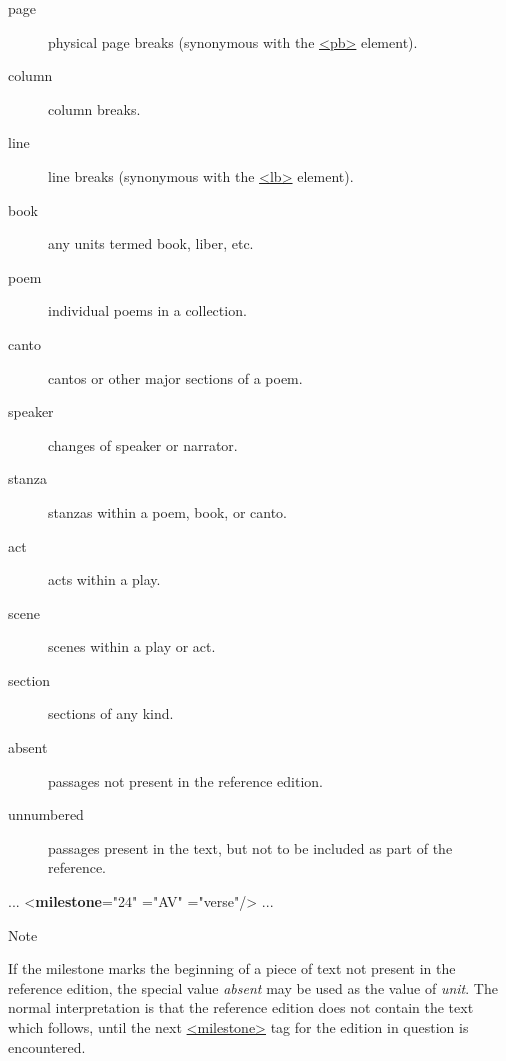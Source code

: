 \begin{reflist}
\begin{sansreflist}
\begin{reflist}
\begin{description}
\item[{page}]physical page breaks (synonymous with the \hyperref[TEI.pb]{<pb>} element).
\item[{column}]column breaks.
\item[{line}]line breaks (synonymous with the \hyperref[TEI.lb]{<lb>} element).
\item[{book}]any units termed book, liber, etc.
\item[{poem}]individual poems in a collection.
\item[{canto}]cantos or other major sections of a poem.
\item[{speaker}]changes of speaker or narrator.
\item[{stanza}]stanzas within a poem, book, or canto.
\item[{act}]acts within a play.
\item[{scene}]scenes within a play or act.
\item[{section}]sections of any kind.
\item[{absent}]passages not present in the reference edition.
\item[{unnumbered}]passages present in the text, but not to be included as part of the reference.
\end{description} 
    \item[]\mbox{}\newline 
 ... {<\textbf{milestone}\hspace*{1em}{n}="{24}"\mbox{}\newline 
\hspace*{1em}{ed}="{AV}"\mbox{}\newline 
\hspace*{1em}{unit}="{verse}"/>} ...
    \item[{Note}]
  \par
If the milestone marks the beginning of a piece of text not present in the reference edition, the special value \textit{absent} may be used as the value of {\itshape unit}. The normal interpretation is that the reference edition does not contain the text which follows, until the next \hyperref[TEI.milestone]{<milestone>} tag for the edition in question is encountered.\par

\end{reflist}
\end{sansreflist}
\end{reflist}
